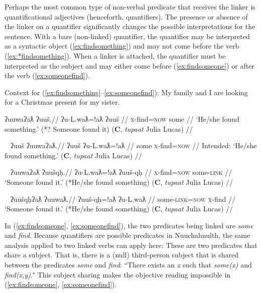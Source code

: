 Perhaps the most common type of non-verbal predicate that receives the linker is quantificational adjectives (henceforth, quantifiers). The presence or absence of the linker on a quantifier significantly changes the possible interpretations for the sentence. With a bare (non-linked) quantifier, the quantifier may be interpreted as a syntactic object (\ref{ex:findsomething}) and may not come before the verb (\ref{ex:*findsomething}). When a linker is attached, the quantifier must be interpreted as the subject and may either come before (\ref{ex:findsomeone}) or after the verb (\ref{ex:someonefind}).

\vspace{5pt}

\noindent Context for (\ref{ex:findsomething}--\ref{ex:someonefind}): My family and I are looking for a Christmas present for my sister.

\ex \label{ex:findsomething}
\begingl
\glpreamble ʔuuwaʔaƛ ʔuuš.//
\gla ʔu-L.waƛ=!aƛ ʔuuš //
\glb \textsc{x}-find=\textsc{now} some //
\glft `He/she found something.' (*? Someone found it) (\textbf{C}, \textit{tupaat} Julia Lucas) //
\endgl
\xe

\ex~ \label{ex:*findsomething}
\begingl
\glpreamble *ʔuuš ʔuuwaʔaƛ.//
\gla ʔuuš ʔu-L.waƛ=!aƛ //
\glb some \textsc{x}-find=\textsc{now} //
\glft Intended: `He/she found something.' (\textbf{C}, \textit{tupaat} Julia Lucas) //
\endgl
\xe

\ex~ \label{ex:findsomeone}
\begingl
\glpreamble ʔuuwaʔaƛ ʔuušqḥ.//
\gla ʔu-L.waƛ=!aƛ ʔuuš-qḥ //
\glb \textsc{x}-find=\textsc{now} some-\textsc{link} //
\glft `Someone found it.' (*He/she found something) (\textbf{C}, \textit{tupaat} Julia Lucas) //
\endgl
\xe

\ex~ \label{ex:someonefind}
\begingl
\glpreamble ʔuušqḥʔaƛ ʔuuwaƛ.//
\gla ʔuuš-qḥ=!aƛ ʔu-L.waƛ //
\glb some-\textsc{link}=\textsc{now} \textsc{x}-find //
\glft `Someone found it.' (*He/she found something) (\textbf{C}, \textit{tupaat} Julia Lucas) //
\endgl
\xe

\begin{comment}
\ex \label{ex:someonefind2}
\begingl
\glpreamble ʔuušqḥ ʔuuwaʔaƛ.//
\gla ʔuuš-qḥ ʔu-L.waƛ=!aƛ //
\glb some-\textsc{link} \textsc{x}-find=\textsc{now} //
\glft `Someone found it.' (*He/she found something) //
\endgl
\xe
\end{comment}

In (\ref{ex:findsomeone}, \ref{ex:someonefind}), the two predicates being linked are \textit{some} and \textit{find}. Because quantifiers are possible predicates in Nuuchahnulth, the same analysis applied to two linked verbs can apply here: These are two predicates that share a subject. That is, there is a (null) third-person subject that is shared between the predicates \textit{some} and \textit{find}: ``There exists an \textit{x} such that \textit{some(x)} and \textit{find(x,y)}." This subject sharing makes the objective reading impossible in (\ref{ex:findsomeone}, \ref{ex:someonefind}).

